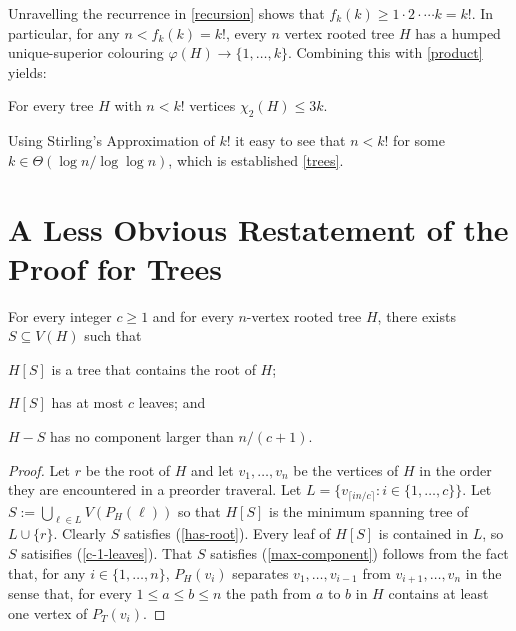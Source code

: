 \documentclass[kpfonts]{patmorin}
\newcommand{\uqs}{\chi_2}
\begin{document}
Unravelling the recurrence in \cref{recursion} shows that $f_k(k)\ge 1\cdot2\cdot\cdots k=k!$.  In particular, for any $n < f_k(k)=k!$, every $n$ vertex rooted tree $H$ has a humped unique-superior colouring $\varphi(H)\to\{1,\ldots,k\}$. Combining this with \cref{product} yields:

\begin{thm}
    For every tree $H$ with $n<k!$ vertices $\uqs(H)\le 3k$.
\end{thm}

Using Stirling's Approximation of $k!$ it easy to see that $n < k!$ for some $k\in\Theta(\log n/\log\log n)$, which is established \cref{trees}.

\section{A Less Obvious Restatement of the Proof for Trees}

\begin{lem}\label{tree-separator}
    For every integer $c\ge 1$ and for every $n$-vertex rooted tree $H$, there exists $S\subseteq V(H)$ such that
    \begin{inparaenum}[(i)]
        \item $H[S]$ is a tree that contains the root of $H$; \label{has-root}
        \item $H[S]$ has at most $c$ leaves; and \label{c-1-leaves}
        \item $H-S$ has no component larger than $n/(c+1)$. \label{max-component}
    \end{inparaenum}
\end{lem}

\begin{proof}
    Let $r$ be the root of $H$ and let $v_1,\ldots,v_n$ be the vertices of $H$ in the order they are encountered in a preorder traveral.  Let $L=\{v_{\lceil in/c\rceil}: i\in\{1,\ldots,c\}\}$.  Let $S:=\bigcup_{\ell\in L} V(P_H(\ell))$ so that $H[S]$ is the minimum spanning tree of $L\cup\{r\}$.  Clearly $S$ satisfies (\ref{has-root}).  Every leaf of $H[S]$ is contained in $L$, so $S$ satisifies (\ref{c-1-leaves}).  That $S$ satisfies (\ref{max-component}) follows from the fact that, for any $i\in\{1,\ldots,n\}$, $P_H(v_i)$ separates $v_1,\ldots,v_{i-1}$ from $v_{i+1},\ldots,v_n$ in the sense that, for every $1\le a\le b\le n$ the path from $a$ to $b$ in $H$ contains at least one vertex of $P_T(v_i)$.
\end{proof}
\end{document}
